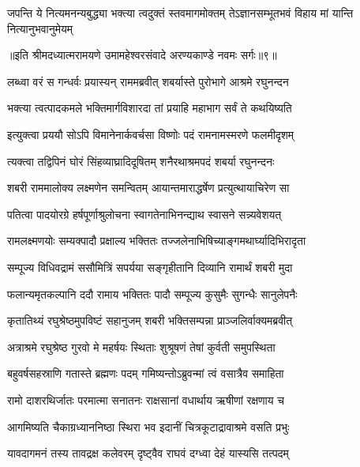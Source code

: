 \fourlineindentedshloka
{जपन्ति ये नित्यमनन्यबुद्ध्या}
{भक्त्या त्वदुक्तं स्तवमागमोक्तम्}
{तेऽज्ञानसम्भूतभवं विहाय}
{मां यान्ति नित्यानुभवानुमेयम्} %

{॥इति श्रीमदध्यात्मरामयणे उमामहेश्वरसंवादे
अरण्यकाण्डे नवमः सर्गः॥९॥
}





\twolineshloka
{लब्ध्वा वरं स गन्धर्वः प्रयास्यन् राममब्रवीत्}
{शबर्यास्ते पुरोभागे आश्रमे रघुनन्दन} %

\twolineshloka
{भक्त्या त्वत्पादकमले भक्तिमार्गविशारदा}
{तां प्रयाहि महाभाग सर्वं ते कथयिष्यति} %

\twolineshloka
{इत्युक्त्वा प्रययौ सोऽपि विमानेनार्कवर्चसा}
{विष्णोः पदं रामनामस्मरणे फलमीदृशम्} %

\twolineshloka
{त्यक्त्वा तद्विपिनं घोरं सिंहव्याघ्रादिदूषितम्}
{शनैरथाश्रमपदं शबर्या रघुनन्दनः} %

\twolineshloka
{शबरी राममालोक्य लक्ष्मणेन समन्वितम्}
{आयान्तमाराद्धर्षेण प्रत्युत्थायाचिरेण सा} %

\twolineshloka
{पतित्वा पादयोरग्रे हर्षपूर्णाश्रुलोचना}
{स्वागतेनाभिनन्द्याथ स्वासने सन्न्यवेशयत्} %

\twolineshloka
{रामलक्ष्मणयोः सम्यक्पादौ प्रक्षाल्य भक्तितः}
{तज्जलेनाभिषिच्याङ्गमथार्घ्यादिभिरादृता} %

\twolineshloka
{सम्पूज्य विधिवद्रामं ससौमित्रिं सपर्यया}
{सङ्गृहीतानि दिव्यानि रामार्थं शबरी मुदा} %

\twolineshloka
{फलान्यमृतकल्पानि ददौ रामाय भक्तितः}
{पादौ सम्पूज्य कुसुमैः सुगन्धैः सानुलेपनैः} %

\twolineshloka
{कृतातिथ्यं रघुश्रेष्ठमुपविष्टं सहानुजम्}
{शबरी भक्तिसम्पन्ना प्राञ्जलिर्वाक्यमब्रवीत्} %

\twolineshloka
{अत्राश्रमे रघुश्रेष्ठ गुरवो मे महर्षयः}
{स्थिताः शुश्रूषणं तेषां कुर्वती समुपस्थिता} %

\twolineshloka
{बहुवर्षसहस्राणि गतास्ते ब्रह्मणः पदम्}
{गमिष्यन्तोऽब्रुवन्मां त्वं वसात्रैव समाहिता} %

\twolineshloka
{रामो दाशरथिर्जातः परमात्मा सनातनः}
{राक्षसानां वधार्थाय ऋषीणां रक्षणाय च} %

\twolineshloka
{आगमिष्यति चैकाग्रध्याननिष्ठा स्थिरा भव}
{इदानीं चित्रकूटाद्रावाश्रमे वसति प्रभुः} %

\twolineshloka
{यावदागमनं तस्य तावद्रक्ष कलेवरम्}
{दृष्ट्वैव राघवं दग्ध्वा देहं यास्यसि तत्पदम्} %

